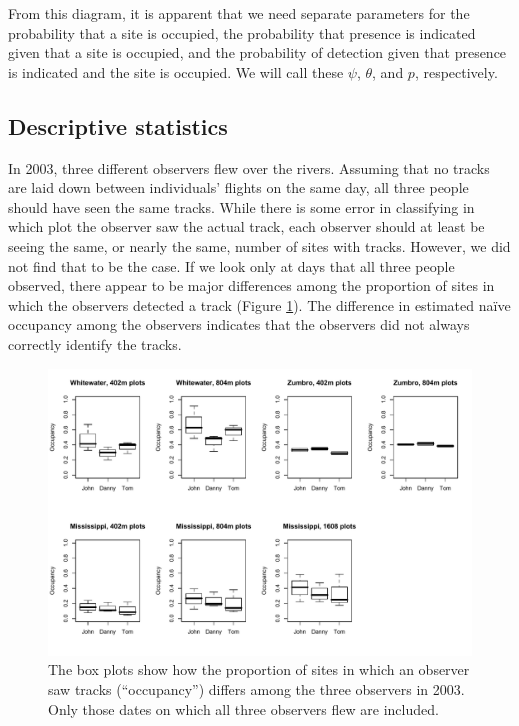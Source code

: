 \documentclass[12pt]{article}
\begin{document}
    From this diagram, it is apparent that we need separate parameters for the
    probability that a site is occupied, the probability that presence is
    indicated given that a site is occupied, and the probability of detection
    given that presence is indicated and the site is occupied. We will call
    these \(\psi\), \(\theta\), and \(p\), respectively.

    \subsection{Descriptive statistics}
    In 2003, three different observers flew over the rivers. Assuming that no
    tracks are laid down between individuals' flights on the same day, all three
    people should have seen the same tracks. While there is some error in
    classifying in which plot the observer saw the actual track, each observer
    should at least be seeing the same, or nearly the same, number of sites with
    tracks. However, we did not find that to be the case. If we look only at
    days that all three people observed, there appear to be major differences
    among the proportion of sites in which the observers detected a track
    (Figure \ref{obsPlots}). The difference in estimated na\"ive occupancy among 
    the
    observers indicates that the observers did not always correctly identify
    the tracks.

    \begin{figure}
        	\centering
	    \includegraphics[width=5in]{observerPlots.pdf}
	    \caption{The box plots show how the proportion of sites in which an 
	    observer saw tracks (``occupancy'') differs among the three observers in 
	    2003. Only those dates on which all three observers flew are included.}
	    \label{obsPlots}
    \end{figure}
\end{document}
